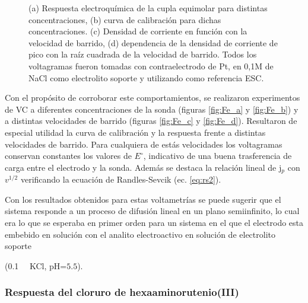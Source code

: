{\begin{figure}[ht]
     		 \caption[Respuesta electroquímica para \fe]{(a) Respuesta electroquímica de la cupla equimolar \fe\space para distintas concentraciones, (b) curva de calibración para dichas concentraciones. (c) Densidad de corriente en función con la velocidad de barrido, (d) dependencia de la densidad de corriente de pico con la raíz cuadrada de la velocidad de barrido. Todos los voltagramas fueron tomadas con contraelectrodo de Pt, en 0,1M de NaCl como electrolito soporte y utilizando como referencia ESC.}
     		 \label{fig:ferro-ferri-CV}
     		 \end{figure}

     		 Con el propósito de corroborar este comportamientos, se realizaron experimentos de VC a diferentes concentraciones de la sonda (figuras \ref{fig:Fe_a} y  \ref{fig:Fe_b}) y a distintas velocidades de barrido (figuras \ref{fig:Fe_c} y  \ref{fig:Fe_d}). Resultaron de especial utilidad la curva de calibración y la respuesta frente a distintas velocidades de barrido. Para cualquiera de estás velocidades los voltagramas conservan constantes los valores de $E^\circ$, indicativo de una buena trasferencia de carga entre el electrodo y la sonda. Además se destaca la relación lineal de j$_p$ con $v^{1/2}$ verificando la ecuación de Randles-Sevcik (ec. \ref{eq:rs2}).		  	  
  					
		  	 Con los resultados obtenidos para estas voltametrías se puede sugerir que el sistema responde a un proceso de difusión lineal en un plano semiinfinito, lo cual era lo que se esperaba en primer orden para un sistema en el que el electrodo esta embebido en solución con el analito electroactivo en solución de electrolito soporte {(\SI{0,1}{\milli\Molar} KCl, pH=$5.5$)\cite{Wi2000,Pumera2007,Gewirth2004,Villullas2000}.

	 	\subsubsection*{Respuesta del cloruro de hexaaminorutenio(III)}
	
}}
